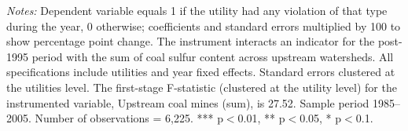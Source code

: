 \begin{table}[htbp]
{\begin{tabular}{p{5.5cm}>{\raggedleft\arraybackslash}p{3cm}>{\raggedleft\arraybackslash}p{3cm}>{\raggedleft\arraybackslash}p{3cm}}
\hline\hline
\end{tabular}
}
\begin{minipage}{14.5cm}
\vspace{4pt}
\footnotesize
\raggedright
\textit{Notes:} Dependent variable equals 1 if the utility had any violation of that type during the year, 0 otherwise; coefficients and standard errors multiplied by 100 to show percentage point change. The instrument interacts an indicator for the post-1995 period with the sum of coal sulfur content across upstream watersheds. All specifications include utilities and year fixed effects. Standard errors clustered at the utilities level. The first-stage F-statistic (clustered at the utility level) for the instrumented variable, Upstream coal mines (sum), is 27.52. Sample period 1985--2005. Number of observations = 6,225. *** p$<$0.01, ** p$<$0.05, * p$<$0.1.
\end{minipage}
\end{table}
